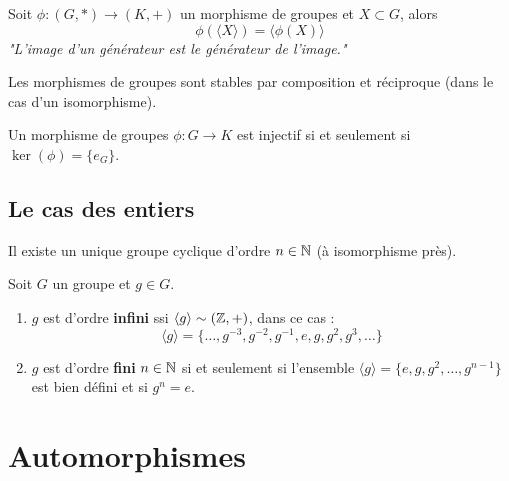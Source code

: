 \begin{corollary}
    Soit $\phi : (G,*) \longrightarrow (K,+)$ un morphisme de groupes et $X \subset G$, alors 
        \[ \boxed{ \phi(\langle  X \rangle ) =  \langle \phi(X) \rangle } \] 
    \emph{"L'image d'un générateur est le générateur de l'image."}
\end{corollary}

\begin{prop}[Stabilité]
    Les morphismes de groupes sont stables par composition et réciproque (dans le cas d'un isomorphisme).
\end{prop}

\begin{lemma}
    Un morphisme de groupes $\phi : G \longrightarrow K$ est injectif si et seulement si $\ker(\phi) = \{e_{G}\}$.
\end{lemma}

\subsection{Le cas des entiers}

\begin{proposition}
    Il existe un unique groupe cyclique d'ordre $n \in \mathbb{N}$  (à isomorphisme près). 
\end{proposition}

\begin{theorem}
    Soit $G$ un groupe et $g \in G$. 
    \begin{enumerate}
        \item $g$ est d'ordre \textbf{infini} ssi $\langle g \rangle \sim (\mathbb{Z},+)$, dans ce cas :
            \[ \langle g \rangle = \{\dots, g^{-3}, g^{-2}, g^{-1}, e, g, g^2, g^3, \dots \} \] 
        \item $g$ est d'ordre \textbf{fini} $n \in \mathbb{N}$ si et seulement si l'ensemble $\langle g \rangle = \{e, g, g^2, \dots, g^{n-1}\}$ 
        est bien défini et si $g^n = e$.
    \end{enumerate}
\end{theorem}


\section{Automorphismes}

